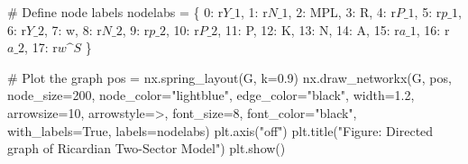 \documentclass[
  letterpaper,
  DIV=11,
  numbers=noendperiod]{scrreprt}
\newenvironment{Shaded}{\begin{snugshade}}{\end{snugshade}}
\newcommand{\CommentTok}[1]{\textcolor[rgb]{0.37,0.37,0.37}{#1}}
\newcommand{\DecValTok}[1]{\textcolor[rgb]{0.68,0.00,0.00}{#1}}
\newcommand{\FloatTok}[1]{\textcolor[rgb]{0.68,0.00,0.00}{#1}}
\newcommand{\NormalTok}[1]{\textcolor[rgb]{0.00,0.23,0.31}{#1}}
\newcommand{\OperatorTok}[1]{\textcolor[rgb]{0.37,0.37,0.37}{#1}}
\newcommand{\StringTok}[1]{\textcolor[rgb]{0.13,0.47,0.30}{#1}}
\newcommand{\VariableTok}[1]{\textcolor[rgb]{0.07,0.07,0.07}{#1}}
\newcommand{\VerbatimStringTok}[1]{\textcolor[rgb]{0.13,0.47,0.30}{#1}}
\begin{document}
\begin{tcolorbox}
\begin{Shaded}
\begin{Highlighting}[]
\CommentTok{\# Define node labels}
\NormalTok{nodelabs }\OperatorTok{=}\NormalTok{ \{}
    \DecValTok{0}\NormalTok{: }\VerbatimStringTok{r\textquotesingle{}$Y\_1$\textquotesingle{}}\NormalTok{, }\DecValTok{1}\NormalTok{: }\VerbatimStringTok{r\textquotesingle{}$N\_1$\textquotesingle{}}\NormalTok{, }\DecValTok{2}\NormalTok{: }\StringTok{\textquotesingle{}MPL\textquotesingle{}}\NormalTok{, }\DecValTok{3}\NormalTok{: }\StringTok{\textquotesingle{}R\textquotesingle{}}\NormalTok{, }\DecValTok{4}\NormalTok{: }\VerbatimStringTok{r\textquotesingle{}$P\_1$\textquotesingle{}}\NormalTok{, }
    \DecValTok{5}\NormalTok{: }\VerbatimStringTok{r\textquotesingle{}$p\_1$\textquotesingle{}}\NormalTok{, }\DecValTok{6}\NormalTok{: }\VerbatimStringTok{r\textquotesingle{}$Y\_2$\textquotesingle{}}\NormalTok{, }\DecValTok{7}\NormalTok{: }\StringTok{\textquotesingle{}w\textquotesingle{}}\NormalTok{, }\DecValTok{8}\NormalTok{: }\VerbatimStringTok{r\textquotesingle{}$N\_2$\textquotesingle{}}\NormalTok{, }\DecValTok{9}\NormalTok{: }\VerbatimStringTok{r\textquotesingle{}$p\_2$\textquotesingle{}}\NormalTok{, }
    \DecValTok{10}\NormalTok{: }\VerbatimStringTok{r\textquotesingle{}$P\_2$\textquotesingle{}}\NormalTok{, }\DecValTok{11}\NormalTok{: }\StringTok{\textquotesingle{}P\textquotesingle{}}\NormalTok{, }\DecValTok{12}\NormalTok{: }\StringTok{\textquotesingle{}K\textquotesingle{}}\NormalTok{, }\DecValTok{13}\NormalTok{: }\StringTok{\textquotesingle{}N\textquotesingle{}}\NormalTok{, }\DecValTok{14}\NormalTok{: }\StringTok{\textquotesingle{}A\textquotesingle{}}\NormalTok{, }
    \DecValTok{15}\NormalTok{: }\VerbatimStringTok{r\textquotesingle{}$a\_1$\textquotesingle{}}\NormalTok{, }\DecValTok{16}\NormalTok{: }\VerbatimStringTok{r\textquotesingle{}$a\_2$\textquotesingle{}}\NormalTok{, }\DecValTok{17}\NormalTok{: }\VerbatimStringTok{r\textquotesingle{}$w\^{}S$\textquotesingle{}}
\NormalTok{\}}

\CommentTok{\# Plot the graph}
\NormalTok{pos }\OperatorTok{=}\NormalTok{ nx.spring\_layout(G, k}\OperatorTok{=}\FloatTok{0.9}\NormalTok{)}
\NormalTok{nx.draw\_networkx(G, pos, node\_size}\OperatorTok{=}\DecValTok{200}\NormalTok{, node\_color}\OperatorTok{=}\StringTok{"lightblue"}\NormalTok{, }
\NormalTok{                 edge\_color}\OperatorTok{=}\StringTok{"black"}\NormalTok{, width}\OperatorTok{=}\FloatTok{1.2}\NormalTok{, arrowsize}\OperatorTok{=}\DecValTok{10}\NormalTok{, }
\NormalTok{                 arrowstyle}\OperatorTok{=}\StringTok{\textquotesingle{}{-}\textgreater{}\textquotesingle{}}\NormalTok{, font\_size}\OperatorTok{=}\DecValTok{8}\NormalTok{, font\_color}\OperatorTok{=}\StringTok{"black"}\NormalTok{,}
\NormalTok{                 with\_labels}\OperatorTok{=}\VariableTok{True}\NormalTok{, labels}\OperatorTok{=}\NormalTok{nodelabs)}
\NormalTok{plt.axis(}\StringTok{"off"}\NormalTok{)}
\NormalTok{plt.title(}\StringTok{"Figure: Directed graph of Ricardian Two{-}Sector Model"}\NormalTok{)}
\NormalTok{plt.show()}
\end{Highlighting}
\end{Shaded}

\end{tcolorbox}
\end{document}
